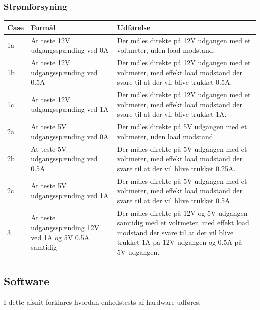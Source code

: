 \subsubsection{Strømforsyning}
\begin{table}[H]
\centering
\begin{tabular}{| p{1cm}  | p{4.5cm} | p{8cm} |}
\hline
Case &Formål &Udførelse\\\hline
1a &At teste 12V udgangsspænding ved 0A &Der måles direkte på 12V udgangen med et voltmeter, uden load modstand.\\\hline
1b &At teste 12V udgangsspænding ved 0.5A  &Der måles direkte på 12V udgangen med et voltmeter, med effekt  load modstand der svare til at der vil blive trukket 0.5A.\\\hline
1c &At teste 12V udgangsspænding ved 1A  &Der måles direkte på 12V udgangen med et voltmeter, med effekt  load modstand der svare til at der vil blive trukket 1A.\\\hline
2a &At teste 5V udgangsspænding ved 0A &Der måles direkte på 5V udgangen med et voltmeter, uden load modstand.\\\hline
2b &At teste 5V udgangsspænding ved 0.5A  &Der måles direkte på 5V udgangen med et voltmeter, med effekt  load modstand der svare til at der vil blive trukket 0.25A.\\\hline
2c &At teste 5V udgangsspænding ved 1A  &Der måles direkte på 5V udgangen med et voltmeter, med effekt  load modstand der svare til at der vil blive trukket 0.5A.\\\hline
3 &At teste udgangsspænding 12V ved 1A og 5V 0.5A samtidig &Der måles direkte på 12V og 5V udgangen samtidig med et voltmeter, med effekt load modstand der svare til at der vil blive trukket 1A på 12V udgangen og 0.5A på 5V udgangen. \\\hline
\end{tabular}
\end{table}
\subsection{Software}
I dette afsnit forklares hvordan enhedstests af hardware udføres.
